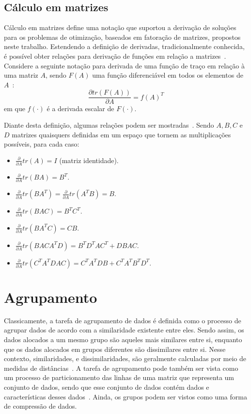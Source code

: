 \documentclass[
    12pt,                %
    oneside,            %
    a4paper,            %
    english,            %
    brazil                %
    ]{abntex2ppgsi}
\begin{document}
\subsection{Cálculo em matrizes}
\label{subsec:matrixcalculus}

Cálculo em matrizes define uma notação que suportou a derivação de soluções para os problemas de otimização, baseados em fatoração de matrizes, propostos neste trabalho.
Estendendo a definição de derivadas, tradicionalmente conhecida, é possível obter relações para derivação de funções em relação a matrizes~\cite{Magnus1999}.
Considere a seguinte notação para derivada de uma função de traço em relação à uma matriz $A$, sendo $F(A)$ uma função diferenciável em todos os elementos de $A$~\cite{Petersen2012}:
\[
    \frac{\partial tr(F(A))}{\partial A} = f(A)^T
\]
em que $f(\cdot)$ é a derivada escalar de $F(\cdot)$.

Diante desta definição, algumas relações podem ser mostradas~\cite{Petersen2012}.
Sendo $A, B, C$ e $D$ matrizes quaisquers definidas em um espaço que tornem as multiplicações possíveis, para cada caso:
\begin{itemize}
    \item $\frac{\partial}{\partial A} tr(A) = I$ (matriz identidade).
    \item $\frac{\partial}{\partial A} tr(B A) = B^T$.
    \item $\frac{\partial}{\partial A} tr(B A^T) = \frac{\partial}{\partial A} tr(A^T B) = B$.
    \item $\frac{\partial}{\partial A} tr(B A C) = B^T C^T$.
    \item $\frac{\partial}{\partial A} tr(B A^T C) = CB$.
    \item $\frac{\partial}{\partial A} tr(B A C A^T D) = B^T D^T A C^T + D B A C$.
    \item $\frac{\partial}{\partial A} tr(C^T A^T D A C) = C^T A^T D B + C^T A^T B^T D^T$.
\end{itemize}

\section{Agrupamento}
\label{sec:clustering}

Classicamente, a tarefa de agrupamento de dados é definida como o processo de agrupar dados de acordo com a similaridade existente entre eles.
Sendo assim, os dados alocados a um mesmo grupo são aqueles mais similares entre si, enquanto que os dados alocados em grupos diferentes são dissimilares entre si.
Nesse contexto, similaridades, e dissimilaridades, são geralmente calculadas por meio de medidas de distâncias~\cite{Han2011}.
A tarefa de agrupamento pode também ser vista como um processo de particionamento das linhas de uma matriz que representa um conjunto de dados, sendo que esse conjunto de dados contém dados e características desses dados~\cite{Han2011}.
Ainda, os grupos podem ser vistos como uma forma de compressão de dados.
\end{document}
